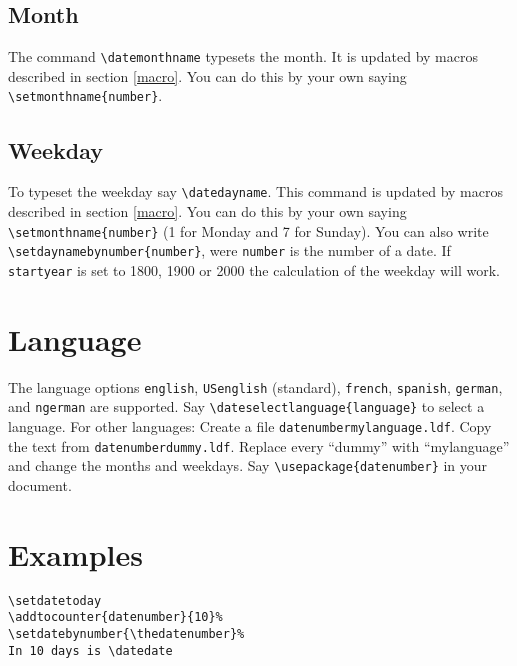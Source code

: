 \subsection{Month\label{monthname}}
The command \verb+\datemonthname+ typesets the month. It is updated by macros described in section \ref{macro}. You can do this by your own saying \verb+\setmonthname{number}+.

\subsection{Weekday\label{dayname}}
To typeset the weekday say \verb+\datedayname+. This command is updated by macros described in section \ref{macro}.
You can do this by your own saying \verb+\setmonthname{number}+ (1 for Monday and 7 for Sunday). You can also write \verb+\setdaynamebynumber{number}+, were \verb+number+ is the number of a date. If \texttt{startyear} is set to 1800, 1900 or 2000 the calculation of the weekday will work.

\section{Language}\sloppypar
The language options \texttt{english}, \texttt{USenglish} (standard), \texttt{french}, \texttt{spanish}, \texttt{german}, and \texttt{ngerman} are supported. Say \verb+\dateselectlanguage{language}+ to select a language. For other languages: Create a file \texttt{datenumbermylanguage.ldf}. Copy the text from \texttt{datenumberdummy.ldf}. Replace every ``dummy'' with ``mylanguage'' and change the months and weekdays. Say \verb+\usepackage{datenumber}+ \verb++ in your document.

\section{Examples}

\begin{teX}
\thedatenumber
\end{teX}


\noindent\texttt{}


\begin{verbatim}
\setdatetoday
\addtocounter{datenumber}{10}%
\setdatebynumber{\thedatenumber}%
In 10 days is \datedate
\end{verbatim}

